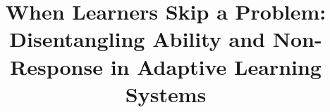 \documentclass[12pt]{article}
\begin{document}
 







\title{When Learners Skip a Problem: Disentangling Ability and Non-Response in Adaptive Learning Systems}
\date{}
\maketitle
\end{document}
